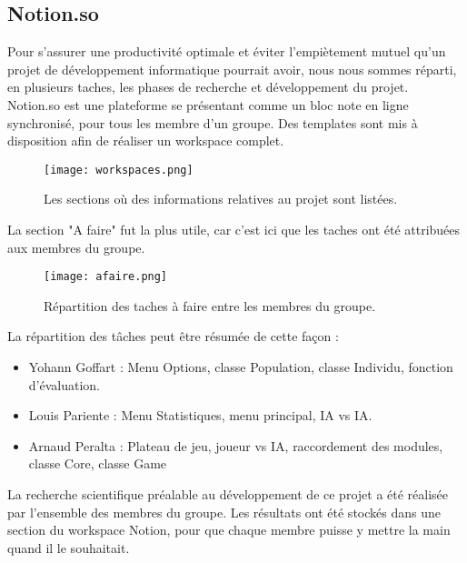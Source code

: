 \documentclass[12pt]{report}
\begin{document}
	\subsection{Notion.so}
	Pour s'assurer une productivité optimale et éviter l'empiètement mutuel qu'un projet de développement informatique pourrait avoir, nous nous sommes réparti, en plusieurs taches, les phases de recherche et développement du projet.\\
	Notion.so est une plateforme se présentant comme un bloc note en ligne synchronisé, pour tous les membre d'un groupe. Des templates sont mis à disposition afin de réaliser un workspace complet.
	\begin{figure}[h]
		\captionsetup{justification=centering}
    	\begin{center}
		\texttt{[image: workspaces.png]}
		\caption{Les sections où des informations relatives au projet sont listées.}
		\end{center}
	\end{figure}
	\newpage
	\noindent La section "A faire" fut la plus utile, car c'est ici que les taches ont été attribuées aux membres du groupe.
	\begin{figure}[h]
		\captionsetup{justification=centering}
    	\begin{center}
		\texttt{[image: afaire.png]}
		\caption{Répartition des taches à faire entre les membres du groupe.}
		\end{center}
	\end{figure}
	La répartition des tâches peut être résumée de cette façon :
	\begin{itemize}
		\item Yohann Goffart : Menu Options, classe Population, classe Individu, fonction d'évaluation.
		\item Louis Pariente : Menu Statistiques, menu principal, IA vs IA.
		\item Arnaud Peralta : Plateau de jeu, joueur vs IA, raccordement des modules, classe Core, classe Game
	\end{itemize}
	La recherche scientifique préalable au développement de ce projet a été réalisée par l'ensemble des membres du groupe. Les résultats ont été stockés dans une section du workspace Notion, pour que chaque membre puisse y mettre la main quand il le souhaitait.
	\newpage
\end{document}
